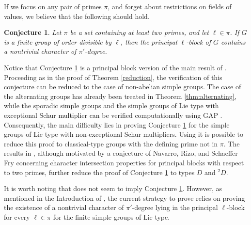 \documentclass[a4paper,12pt,leqno]{amsart}
\newcommand{\6}{^}
\newtheorem{con}[subsection]{Conjecture}
\theoremstyle{definition}
\theoremstyle{definition}
\theoremstyle{definition}
\theoremstyle{definition}
\theoremstyle{definition}
\begin{document}
If we focus on any pair of primes $\pi$, and forget about restrictions on fields of values, we believe that the following should hold.

\begin{con}\label{con:twoprimes}
Let $\pi$ be a set containing at least two primes, and let $\ell \in \pi$. If $G$ is a finite group of order divisible by $\ell$, then the principal $\ell$-block of $G$ contains a nontrivial character of $\pi'$-degree.
\end{con}

Notice that Conjecture \ref{con:twoprimes} is a principal block version of the main result of \cite{GSV19}. Proceeding as in the proof of Theorem \ref{reduction}, the verification of this conjecture can be reduced to the case of non-abelian simple groups. The case of the alternating groups has already been treated in Theorem \ref{thm:alternating}, while the sporadic simple groups and the simple groups of Lie type with exceptional Schur multiplier can be verified computationally using GAP \cite{GAP}. Consequently, the main difficulty lies in proving Conjecture \ref{con:twoprimes} for the simple groups of Lie type with non-exceptional Schur multipliers. Using \cite[Lemmas 3.5 and 3.6]{NRS22} it is possible to reduce this proof to classical-type groups with the defining prime not in $\pi$.
The results in \cite[Theorem A]{Bar25}, although motivated by a conjecture of Navarro, Rizo, and Schaeffer Fry \cite[Conjecture A]{NRS22} concerning character intersection properties for principal blocks with respect to two primes, further reduce the proof of Conjecture \ref{con:twoprimes} to types $D$ and ${}^2D$.

It is worth noting that \cite[Conjecture A]{NRS22} does not seem to imply Conjecture \ref{con:twoprimes}. However, as mentioned in the Introduction of \cite{Bar25}, the current strategy to prove \cite[Conjecture A]{NRS22} relies on proving the existence
of a nontrivial character of $\pi'$-degree lying in the principal $\ell$-block for every $\ell\in \pi$ for the finite simple groups of Lie type. 
\end{document}
